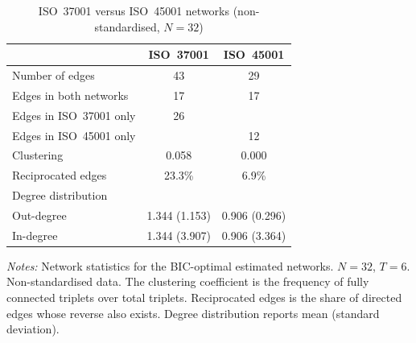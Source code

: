 \begin{table}[htbp]
\centering
\caption{ISO~37001 versus ISO~45001 networks (non-standardised, $N=32$)}
\label{tab:networks_nonstd}
\begin{tabular}{lcc}
\hline\hline
 & ISO~37001 & ISO~45001 \\
\hline
Number of edges & 43 & 29 \\
Edges in both networks & 17 & 17 \\
Edges in ISO~37001 only & 26 & \\
Edges in ISO~45001 only & & 12 \\
Clustering & 0.058 & 0.000 \\
Reciprocated edges & 23.3\% & 6.9\% \\
Degree distribution & & \\
\quad Out-degree & 1.344 (1.153) & 0.906 (0.296) \\
\quad In-degree & 1.344 (3.907) & 0.906 (3.364) \\
\hline\hline
\end{tabular}
\begin{minipage}{0.85\textwidth}
\vspace{4pt}
\footnotesize \textit{Notes:} Network statistics for the BIC-optimal estimated networks. $N=32$, $T=6$. Non-standardised data. The clustering coefficient is the frequency of fully connected triplets over total triplets. Reciprocated edges is the share of directed edges whose reverse also exists. Degree distribution reports mean (standard deviation).
\end{minipage}
\end{table}
